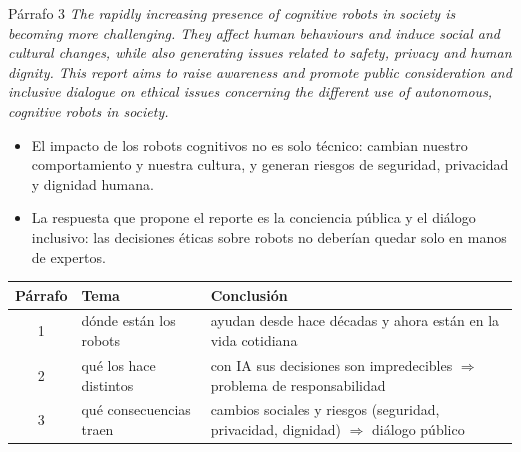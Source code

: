 \documentclass[11pt,a4paper]{article}
\begin{document}
\begin{enunciado}{Párrafo 3}
\textit{The rapidly increasing presence of cognitive robots in society is becoming more challenging. They affect human behaviours and induce social and cultural changes, while also generating issues related to safety, privacy and human dignity. This report aims to raise awareness and promote public consideration and inclusive dialogue on ethical issues concerning the different use of autonomous, cognitive robots in society.}
\end{enunciado}
\begin{itemize}
  \item El impacto de los robots cognitivos no es solo técnico: cambian nuestro comportamiento y nuestra cultura, y generan riesgos de seguridad, privacidad y dignidad humana.
  \item La respuesta que propone el reporte es la conciencia pública y el diálogo inclusivo: las decisiones éticas sobre robots no deberían quedar solo en manos de expertos.
\end{itemize}

\begin{center}
\small
\begin{tabularx}{\linewidth}{@{}c l X@{}}
\toprule
\textbf{Párrafo} & \textbf{Tema} & \textbf{Conclusión} \\
\midrule
1 & dónde están los robots & ayudan desde hace décadas y ahora están en la vida cotidiana \\
2 & qué los hace distintos & con IA sus decisiones son impredecibles $\Rightarrow$ problema de responsabilidad \\
3 & qué consecuencias traen & cambios sociales y riesgos (seguridad, privacidad, dignidad) $\Rightarrow$ diálogo público \\
\bottomrule
\end{tabularx}
\end{center}
\end{document}
